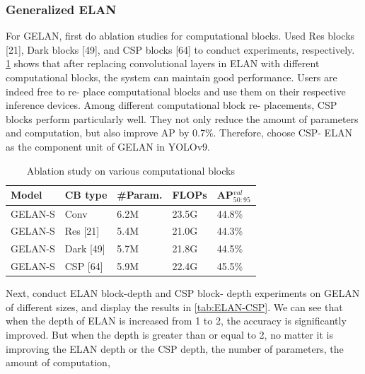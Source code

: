         \subsubsection{Generalized ELAN}
            For GELAN, first do ablation studies for computational
            blocks. Used Res blocks [21], Dark blocks [49], and
            CSP blocks [64] to conduct experiments, respectively. \ref{tab:GELAN}
            shows that after replacing convolutional layers in
            ELAN with different computational blocks, the system can
            maintain good performance. Users are indeed free to re-
            place computational blocks and use them on their respective
            inference devices. Among different computational block re-
            placements, CSP blocks perform particularly well. They
            not only reduce the amount of parameters and computation,
            but also improve AP by 0.7\%. Therefore, choose CSP-
            ELAN as the component unit of GELAN in YOLOv9. \\
            \begin{table}[ht]
                \centering
                \begin{tabular}{| l | l | l | l | l |}
                    \hline
                    \rowcolor{lightgray} Model & CB type & \#Param. & FLOPs & AP${^{val}_{50:95}}$ \\ \hline
                    GELAN-S & Conv & 6.2M & 23.5G & 44.8\% \\ \hline
                    GELAN-S & Res [21] & 5.4M & 21.0G & 44.3\% \\ \hline
                    GELAN-S & Dark [49] & 5.7M & 21.8G & 44.5\% \\ \hline
                    GELAN-S & CSP [64] & 5.9M & 22.4G & 45.5\% \\ \hline
                \end{tabular}
                \caption{Ablation study on various computational blocks}
                \label{tab:GELAN}
            \end{table}
            Next, conduct ELAN block-depth and CSP block-
            depth experiments on GELAN of different sizes, and display
            the results in \ref{tab:ELAN-CSP}. We can see that when the depth
            of ELAN is increased from 1 to 2, the accuracy is significantly
            improved. But when the depth is greater than or
            equal to 2, no matter it is improving the ELAN depth or the
            CSP depth, the number of parameters, the amount of computation,
